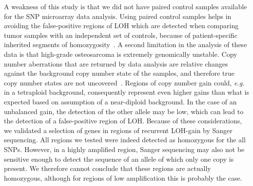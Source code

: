 A weakness of this study is that we did not have paired control samples available for the SNP microarray data analysis. Using paired control samples helps in avoiding the false\hyp{}positive regions of LOH which are detected when comparing tumor samples with an independent set of controls, because of patient\hyp{}specific inherited segments of homozygosity~\cite{heinrichs2010snp}. A second limitation in the analysis of these data is that high\hyp{}grade osteosarcoma is extremely genomically unstable. Copy number aberrations that are returned by data analysis are relative changes against the background copy number state of the samples, and therefore true copy number states are not uncovered~\cite{gardina2008ploidy}. Regions of copy number gain could, {\it e.g.} in a tetraploid background, consequently represent even higher gains than what is expected based on assumption of a near\hyp{}diploid background. In the case of an unbalanced gain, the detection of the other allele may be low, which can lead to the detection of a false\hyp{}positive region of LOH. Because of these considerations, we validated a selection of genes in regions of recurrent LOH-gain by Sanger sequencing. All regions we tested were indeed detected as homozygous for the all SNPs. However, in a highly amplified region, Sanger sequencing may also not be sensitive enough to detect the sequence of an allele of which only one copy is present. We therefore cannot conclude that these regions are actually homozygous, although for regions of low amplification this is probably the case.

